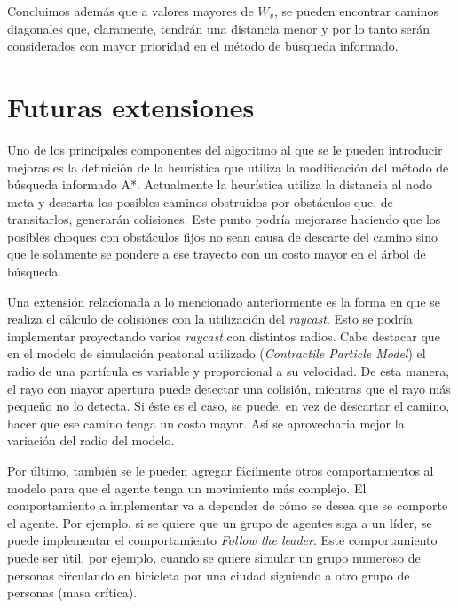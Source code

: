 \documentclass[a4paper,10pt]{article}
\begin{document}
Concluimos además que a valores mayores de $W_{v}$, se pueden encontrar caminos diagonales que, claramente, tendrán una distancia menor y por lo tanto serán considerados con mayor prioridad en el método de búsqueda informado.

\section{Futuras extensiones}

Uno de los principales componentes del algoritmo al que se le pueden introducir mejoras es la definición de la heurística que utiliza la modificación del método de búsqueda informado A*. Actualmente la heurística utiliza la distancia al nodo meta y descarta los posibles caminos obstruidos por obstáculos que, de transitarlos, generarán colisiones. Este punto podría mejorarse haciendo que los posibles choques con obstáculos fijos no sean causa de descarte del camino sino que le solamente se pondere a ese trayecto con un costo mayor en el árbol de búsqueda.

Una extensión relacionada a lo mencionado anteriormente es la forma en que se realiza el cálculo de colisiones con la utilización del \textit{raycast}. Esto se podría implementar proyectando varios \textit{raycast} con distintos radios. Cabe destacar que en el modelo de simulación peatonal utilizado (\textit{Contractile Particle Model}) el radio de una partícula es variable y proporcional a su velocidad. De esta manera, el rayo con mayor apertura puede detectar una colisión, mientras que el rayo más pequeño no lo detecta. Si éste es el caso, se puede, en vez de descartar el camino, hacer que ese camino tenga un costo mayor. Así se aprovecharía mejor la variación del radio del modelo.

Por último, también se le pueden agregar fácilmente otros comportamientos al modelo para que el agente tenga un movimiento más complejo. El comportamiento a implementar va a depender de cómo se desea que se comporte el agente. Por ejemplo, si se quiere que un grupo de agentes siga a un líder, se puede implementar el comportamiento \textit{Follow the leader}. Este comportamiento puede ser útil, por ejemplo, cuando se quiere simular un grupo numeroso de personas circulando en bicicleta por una ciudad siguiendo a otro grupo de personas (masa crítica). 

\pagebreak


\end{document}
